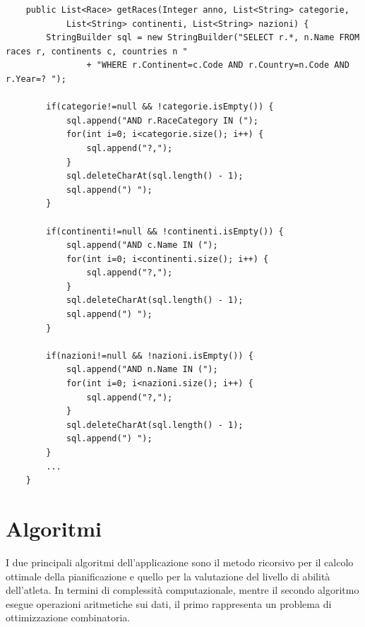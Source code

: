 \documentclass[a4paper, 12pt, oneside]{book}
\begin{document}
\begin{lstlisting}
    public List<Race> getRaces(Integer anno, List<String> categorie,
			List<String> continenti, List<String> nazioni) {
		StringBuilder sql = new StringBuilder("SELECT r.*, n.Name FROM races r, continents c, countries n "
				+ "WHERE r.Continent=c.Code AND r.Country=n.Code AND r.Year=? ");
		
		if(categorie!=null && !categorie.isEmpty()) {
			sql.append("AND r.RaceCategory IN (");
			for(int i=0; i<categorie.size(); i++) {
				sql.append("?,");
			}
			sql.deleteCharAt(sql.length() - 1);
			sql.append(") ");
		}
		
		if(continenti!=null && !continenti.isEmpty()) {
			sql.append("AND c.Name IN (");
			for(int i=0; i<continenti.size(); i++) {
				sql.append("?,");
			}
			sql.deleteCharAt(sql.length() - 1);
			sql.append(") ");
		}
		
		if(nazioni!=null && !nazioni.isEmpty()) {
			sql.append("AND n.Name IN (");
			for(int i=0; i<nazioni.size(); i++) {
				sql.append("?,");
			}
			sql.deleteCharAt(sql.length() - 1);
			sql.append(") ");
		}
        ...
    }
\end{lstlisting} 

\section{Algoritmi} \label{sec:algoritmi}
I due principali algoritmi dell'applicazione sono il metodo ricorsivo per il calcolo ottimale della pianificazione e quello per la valutazione del livello di abilità dell'atleta. In termini di complessità computazionale, mentre il secondo algoritmo esegue operazioni aritmetiche sui dati, il primo rappresenta un problema di ottimizzazione combinatoria. 
\end{document}

